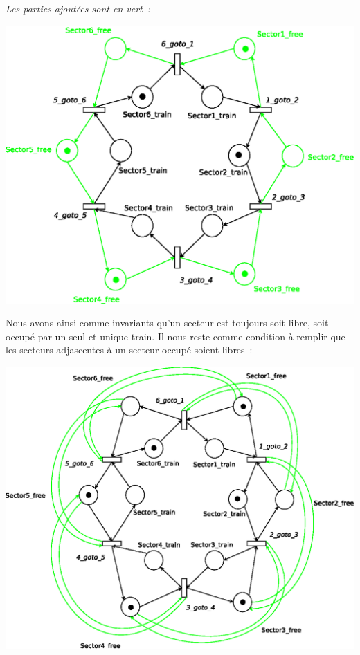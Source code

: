 \emph{Les parties ajoutées sont en vert~:}

\begin{center}
\includegraphics[height = 0.4\paperwidth]{exo8_2.eps}
\end{center}

Nous avons ainsi comme invariants qu'un secteur est toujours soit libre, soit
occupé par un seul et unique train. Il nous reste comme condition à remplir que
les secteurs adjascentes à un secteur occupé soient libres~:

\begin{center}
\includegraphics[height = 0.5\paperwidth]{exo8_3.eps}
\end{center}

